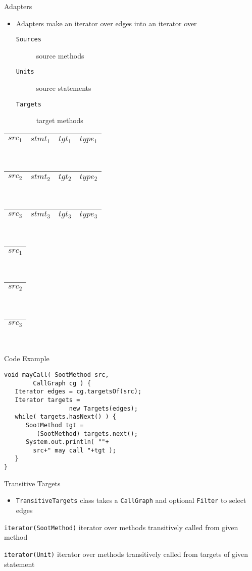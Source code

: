 \begin{slide}{Adapters}
\begin{itemize}
\item Adapters make an iterator over edges into an iterator over
\begin{description}
\item[{\tt Sources}] source methods
\item[{\tt Units}] source statements
\item[{\tt Targets}] target methods
\end{description}
\end{itemize}
\newcommand{\src}[1]{\begin{tabular}{|c|}\hline {\red $src_#1$}\\\hline\end{tabular}}
\newcommand{\edge}[1]{\begin{tabular}{|c|c|c|c|}\hline {\red $src_#1$}&$stmt_#1$&$tgt_#1$&$type_#1$\\\hline\end{tabular}}
\begin{minipage}{2.5in}
\edge{1}\\
\edge{2}\\
\edge{3}\\
\end{minipage}
\begin{minipage}{1in}
\src{1}\\
\src{2}\\
\src{3}\\
\end{minipage}
\end{slide}

\begin{slide}{Code Example}
\begin{verbatim}
void mayCall( SootMethod src,
        CallGraph cg ) {
   Iterator edges = cg.targetsOf(src);
   Iterator targets =
                  new Targets(edges);
   while( targets.hasNext() ) {
      SootMethod tgt =
         (SootMethod) targets.next();
      System.out.println( ""+
        src+" may call "+tgt );
   }
}
\end{verbatim}
\end{slide}

\begin{slide}{Transitive Targets}
\begin{itemize}
\item {\tt TransitiveTargets} class takes a {\tt CallGraph} and
optional {\tt Filter} to select edges
\end{itemize}
\begin{description}
\item {\tt iterator(SootMethod)} iterator over methods transitively
called from given method
\item {\tt iterator(Unit)} iterator over methods transitively
called from targets of given statement
\end{description}
\end{slide}

